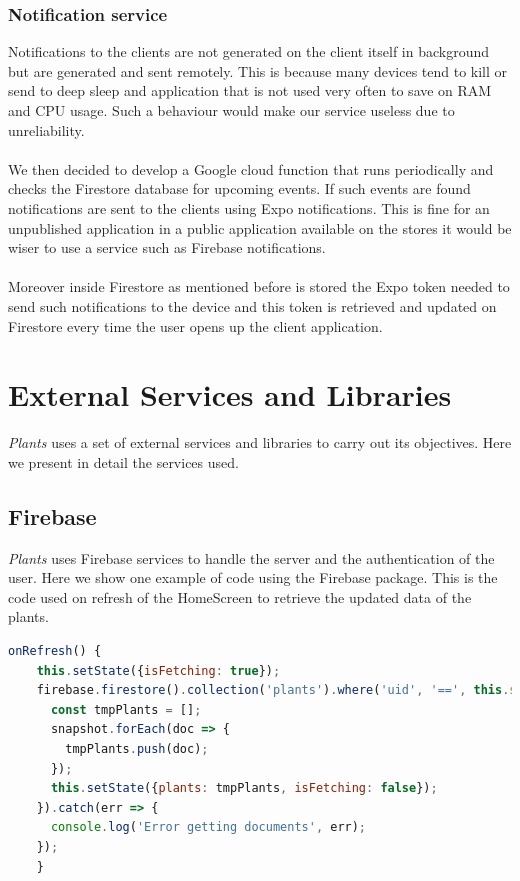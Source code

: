 \documentclass[10pt]{article}
\begin{document}
	\subsubsection{Notification service}
	Notifications to the clients are not generated on the client itself in background but are generated and sent remotely. This is because many devices tend to kill or send to deep sleep and application that is not used very often to save on RAM and CPU usage. Such a behaviour would make our service useless due to unreliability. \\\\ We then decided to develop a Google cloud function that runs periodically and checks the Firestore database for upcoming events. If such events are found notifications are sent to the clients using Expo notifications. This is fine for an unpublished application in a public application available on the stores it would be wiser to use a service such as Firebase notifications.\\\\ Moreover inside Firestore as mentioned before is stored the Expo token needed to send such notifications to the device and this token is retrieved and updated on Firestore every time the user opens up the client application.
	
	\section{External Services and Libraries}
	\textit{Plants} uses a set of external services and libraries to carry out its objectives. Here we present in detail the services used.
	
	\subsection{Firebase}
	\textit{Plants} uses Firebase services to handle the server and the authentication of the user. Here we show one example of code using the Firebase package. This is the code used on refresh of the HomeScreen to retrieve the updated data of the plants.
	\begin{lstlisting}[language=JavaScript]
    onRefresh() {
    this.setState({isFetching: true});
    firebase.firestore().collection('plants').where('uid', '==', this.state.user.uid).get().then(snapshot => {
      const tmpPlants = [];
      snapshot.forEach(doc => {
        tmpPlants.push(doc);
      });
      this.setState({plants: tmpPlants, isFetching: false});
    }).catch(err => {
      console.log('Error getting documents', err);
    });
    }
	\end{lstlisting}
\end{document}
